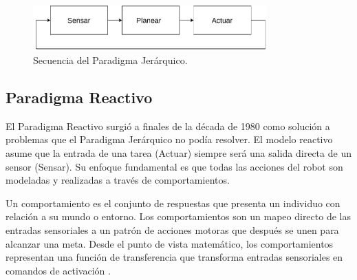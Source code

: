\begin{figure}
    \centering
    \includegraphics[width=0.8\textwidth]{Figures/Figures_Cap06/hierarchical_paradigm.pdf}
    \caption{Secuencia del Paradigma Jerárquico.}
    \label{fig:hierarchical_paradigm}
\end{figure}

\subsection{Paradigma Reactivo} \label{sub:paradigma_reactivo}

El Paradigma Reactivo surgió a finales de la década de 1980 como solución a problemas que el Paradigma Jerárquico no podía resolver. El modelo reactivo asume que la entrada de una tarea (Actuar) siempre será una salida directa de un sensor (Sensar). Su enfoque fundamental es que todas las acciones del robot son modeladas y realizadas a través de comportamientos. 

Un comportamiento es el conjunto de respuestas que presenta un individuo con relación a su mundo o entorno. Los comportamientos son un mapeo directo de las entradas sensoriales a un patrón de acciones motoras que después se unen para alcanzar una meta. Desde el punto de vista matemático, los comportamientos representan una función de transferencia que transforma entradas sensoriales en comandos de activación \cite{murphy2019introduction}. 


